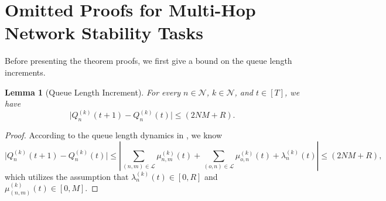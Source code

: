 \documentclass[11pt,fullpage,letterpaper]{article} %
\newtheorem{lemma}[theorem]{Lemma}
\newcommand{\mN}{{\mathcal N}}
\newcommand{\mL}{{\mathcal L}}
\begin{document}
\section{Omitted Proofs for Multi-Hop Network Stability Tasks}
Before presenting the theorem proofs, we first give a bound on the queue length increments.
\begin{lemma}[Queue Length Increment]\label{lem:queue length increment}
For every $n\in \mN$, $k\in \mN$, and $t\in [T]$, we have
\begin{equation*}
\lvert Q_n^{(k)}(t+1)-Q_n^{(k)}(t)\rvert\le (2NM+R).
\end{equation*}
\end{lemma}
\begin{proof}
According to the queue length dynamics in , we know
\begin{equation*}
\lvert Q_n^{(k)}(t+1)-Q_n^{(k)}(t)\rvert\le \left \lvert \sum_{(n,m)\in \mL} \mu_{n,m}^{(k)}(t) + \sum_{(o,n)\in \mL} \mu_{o,n}^{(k)}(t) + \lambda_n^{(k)}(t) \right \rvert\le (2NM+R),
\end{equation*}
which utilizes the assumption that $\lambda_n^{(k)}(t)\in [0,R]$ and $\mu_{(n,m)}^{(k)}(t)\in [0,M]$.
\end{proof}
\end{document}
